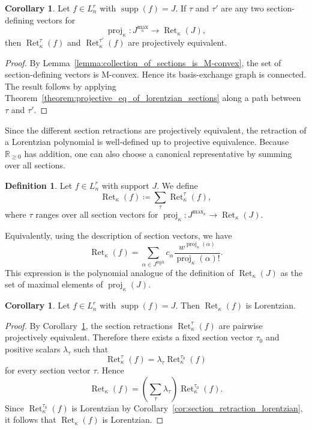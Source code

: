 \documentclass[11pt]{article}
\theoremstyle{definition}
\newtheorem{corollary}[theorem]{Corollary}
\newtheorem{definition}[theorem]{Definition}
\theoremstyle{remark}
\newcommand{\R}{\mathbb{R}}
\DeclareMathOperator{\supp}{supp}
\newcommand{\Lnr}{L_n^r}
\DeclareMathOperator{\proj}{proj}              %
\newcommand{\kproj}{\proj_{\kappa}}            %
\DeclareMathOperator{\Ret}{Ret}                %
\newcommand{\RetK}{\Ret_{\kappa}}              %
\newcommand{\Jmax}{J^{\max_{\kappa}}}
\begin{document}
\begin{corollary}\label{cor:all_lorentzian_sections_projectively_equiv}
    Let $f\in\Lnr$ with $\supp(f)=J$. If $\tau$ and $\tau'$ are any two section-defining vectors for
    \[
        \kproj\colon \Jmax\to\RetK(J),
    \]
    then $\RetK^\tau(f)$ and $\RetK^{\tau'}(f)$ are projectively equivalent.
\end{corollary}

\begin{proof}
    By Lemma~\ref{lemma:collection_of_sections_is_M-convex}, the set of section-defining vectors is M-convex. Hence its basis-exchange graph is connected. The result follows by applying Theorem~\ref{theorem:projective_eq_of_lorentzian_sections} along a path between $\tau$ and $\tau'$.
\end{proof}

Since the different section retractions are projectively equivalent, the retraction of a Lorentzian polynomial is well-defined up to projective equivalence. Because $\R_{\geq 0}$ has addition, one can also choose a canonical representative by summing over all sections.

\begin{definition}\label{def:lorentzian_retraction_sum}
    Let $f\in\Lnr$ with support $J$. We define
    \[
        \RetK(f)
        \coloneqq
        \sum_\tau \RetK^\tau(f),
    \]
    where $\tau$ ranges over all section vectors for $\kproj\colon\Jmax\to\RetK(J)$.
\end{definition}

Equivalently, using the description of section vectors, we have
\[
    \RetK(f)
    =
    \sum_{\alpha\in\Jmax}
    c_\alpha
    \frac{w^{\kproj(\alpha)}}{\kproj(\alpha)!}.
\]
This expression is the polynomial analogue of the definition of $\RetK(J)$ as the set of maximal elements of $\kproj(J)$.

\begin{corollary}\label{cor:lorentzian_retraction_sum}
    Let $f\in\Lnr$ with $\supp(f)=J$. Then $\RetK(f)$ is Lorentzian.
\end{corollary}

\begin{proof}
    By Corollary~\ref{cor:all_lorentzian_sections_projectively_equiv}, the section retractions $\RetK^\tau(f)$ are pairwise projectively equivalent. Therefore there exists a fixed section vector $\tau_0$ and positive scalars $\lambda_\tau$ such that
    \[
        \RetK^\tau(f)=\lambda_\tau\RetK^{\tau_0}(f)
    \]
    for every section vector $\tau$. Hence
    \[
        \RetK(f)
        =
        \left(\sum_\tau\lambda_\tau\right)
        \RetK^{\tau_0}(f).
    \]
    Since $\RetK^{\tau_0}(f)$ is Lorentzian by Corollary~\ref{cor:section_retraction_lorentzian}, it follows that $\RetK(f)$ is Lorentzian.
\end{proof}
\end{document}
